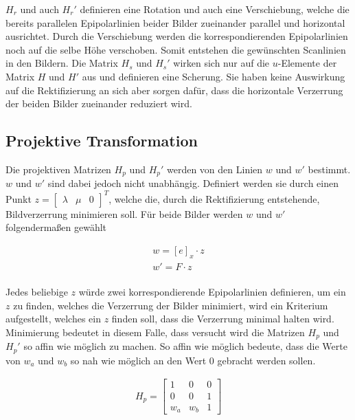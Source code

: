 $H_r$ und auch $H_r'$ definieren eine Rotation und auch eine Verschiebung, welche die bereits parallelen Epipolarlinien beider Bilder zueinander parallel und horizontal ausrichtet. Durch die Verschiebung werden die korrespondierenden Epipolarlinien noch auf die selbe Höhe verschoben. Somit entstehen die gewünschten Scanlinien in den Bildern. Die Matrix $H_s$ und $H_s'$ wirken sich nur auf die $u$-Elemente der Matrix $H$ und $H'$ aus und definieren eine Scherung. Sie haben keine Auswirkung auf die Rektifizierung an sich aber sorgen dafür, dass die horizontale Verzerrung der beiden Bilder zueinander reduziert wird.\\

\subsection{Projektive Transformation}

Die projektiven Matrizen $H_p$ und $H_p'$ werden von den Linien $w$ und $w'$ bestimmt. $w$ und $w'$ sind dabei jedoch nicht unabhängig. Definiert werden sie durch einen Punkt $z = \begin{bmatrix}
\lambda&\mu&0\end{bmatrix}^T$, welche die, durch die Rektifizierung entstehende, Bildverzerrung minimieren soll. Für beide Bilder werden $w$ und $w'$ folgendermaßen gewählt

\begin{gather}
	w = [e]_x \cdot z\\
	w'= F\cdot z
\end{gather}\\

Jedes beliebige $z$ würde zwei korrespondierende Epipolarlinien definieren, um ein $z$ zu finden, welches die Verzerrung der Bilder minimiert, wird ein Kriterium aufgestellt, welches ein $z$ finden soll, dass die Verzerrung minimal halten wird. Minimierung bedeutet in diesem Falle, dass versucht wird die Matrizen $H_p$ und $H_p'$ so affin wie möglich zu machen. So affin wie möglich bedeute, dass die Werte von $w_a$ und $w_b$ so nah wie möglich an den Wert 0 gebracht werden sollen.

\begin{gather}
	H_p = 	\begin{bmatrix}
	1&0&0\\
	0&0&1\\
	w_a&w_b&1
	\end{bmatrix}
\end{gather}

